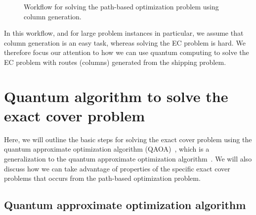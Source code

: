 \documentclass{article}
\begin{document}
\begin{figure}
\begin{center}
\end{center}
\caption{Workflow for solving the path-based optimization problem using column generation.}
\label{fig:column-generation}
\end{figure}

In this workflow, and for large problem instances in particular, we assume that column generation is an easy task, whereas solving the EC problem is hard. We therefore focus our attention to how we can use quantum computing to solve the EC problem with routes (columns) generated from the shipping problem.

\section{Quantum algorithm to solve the exact cover problem}
Here, we will outline the basic steps for solving the exact cover problem using the quantum approximate optimization algorithm (QAOA)~\cite{hadfield2019_qaoa2qaoa},  which is a generalization to the quantum approximate optimization algorithm~\cite{farhi2014QAOA}. We will also discuss how we can take advantage of properties of the specific exact cover problems that occurs from the path-based optimization problem.

\subsection{Quantum approximate optimization algorithm}
\end{document}
